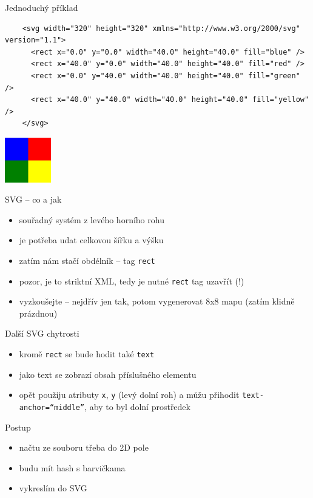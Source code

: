 \documentclass{beamer}
\begin{document}
\begin{frame}[fragile]{Jednoduchý příklad}
  \tiny
  \begin{verbatim}
    <svg width="320" height="320" xmlns="http://www.w3.org/2000/svg" version="1.1">
      <rect x="0.0" y="0.0" width="40.0" height="40.0" fill="blue" />
      <rect x="40.0" y="0.0" width="40.0" height="40.0" fill="red" />
      <rect x="0.0" y="40.0" width="40.0" height="40.0" fill="green" />
      <rect x="40.0" y="40.0" width="40.0" height="40.0" fill="yellow" />
    </svg>
  \end{verbatim}
  \includegraphics[width=0.15\textwidth]{example}
\end{frame}

\begin{frame}{SVG -- co a jak}
  \begin{itemize}
    \item souřadný systém z levého horního rohu
    \item je potřeba udat celkovou šířku a výšku
    \item zatím nám stačí obdélník -- tag \texttt{rect}
    \item pozor, je to striktní XML, tedy je nutné \texttt{rect} tag uzavřít (!)
    \item vyzkoušejte -- nejdřív jen tak, potom vygenerovat 8x8 mapu (zatím klidně prázdnou)
  \end{itemize}
\end{frame}

\begin{frame}{Další SVG chytrosti}
  \begin{itemize}
    \item kromě \texttt{rect} se bude hodit také \texttt{text}
    \item jako text se zobrazí obsah příslušného elementu
    \item opět použiju atributy \texttt{x}, \texttt{y} (levý dolní roh) a můžu přihodit \texttt{text-anchor=``middle''}, aby to byl dolní prostředek
  \end{itemize}
\end{frame}

\begin{frame}{Postup}
  \begin{itemize}
    \item načtu ze souboru třeba do 2D pole
    \item budu mít hash s barvičkama
    \item vykreslím do SVG
  \end{itemize}
\end{frame}
\end{document}
